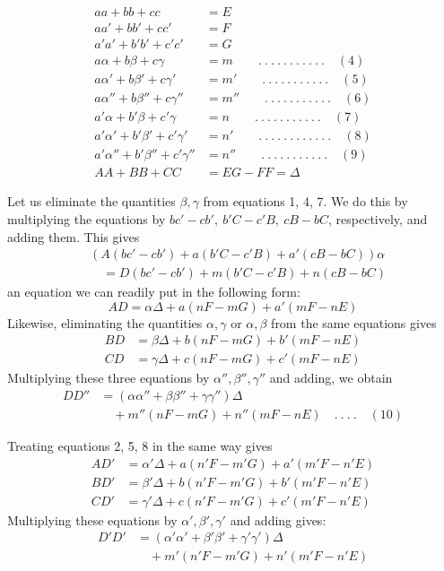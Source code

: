%
\[
\begin{aligned}
aa+bb+cc&=E\\
aa'+bb'+cc'&=F\\
a'a'+b'b'+c'c'&=G\\
a\alpha+b\beta+c\gamma&=m\qquad .\ .\ .\ .\ .\ .\ .\ .\ .\ .\ .\quad(4)\\
a\alpha'+b\beta'+c\gamma'&=m'\qquad .\ .\ .\ .\ .\ .\ .\ .\ .\ .\ .\quad(5)\\
a\alpha''+b\beta''+c\gamma''&=m''\qquad .\ .\ .\ .\ .\ .\ .\ .\ .\ .\ .\quad(6)\\
a'\alpha+b'\beta+c'\gamma&=n\qquad .\ .\ .\ .\ .\ .\ .\ .\ .\ .\ .\quad(7)\\
a'\alpha'+b'\beta'+c'\gamma'&=n'\qquad .\ .\ .\ .\ .\ .\ .\ .\ .\ .\ .\ .\quad(8)\\
a'\alpha''+b'\beta''+c'\gamma''&=n''\qquad .\ .\ .\ .\ .\ .\ .\ .\ .\ .\ .\quad(9)\\
AA+BB+CC&=EG-FF=\Delta
\end{aligned}
\]
\par\indent Let us eliminate the quantities \(\beta,\gamma\) from equations 1, 4, 7. We do this by multiplying the equations by \(bc'-cb',\ b'C-c'B,\ cB-bC\), respectively, and adding them. This gives
\[
\begin{aligned}
&(A(bc'-cb')+a(b'C-c'B)+a'(cB-bC))\alpha\\
&\quad=D(bc'-cb')+m(b'C-c'B)+n(cB-bC)
\end{aligned}
\]
an equation we can readily put in the following form:
\[
AD=\alpha\Delta+a(nF-mG)+a'(mF-nE)
\]
Likewise, eliminating the quantities \(\alpha,\gamma\) or \(\alpha,\beta\) from the same equations gives
\[
\begin{aligned}
BD&=\beta\Delta+b(nF-mG)+b'(mF-nE)\\
CD&=\gamma\Delta+c(nF-mG)+c'(mF-nE)
\end{aligned}
\]
Multiplying these three equations by \(\alpha'',\beta'',\gamma''\) and adding, we obtain
\[
\begin{aligned}
DD''&=(\alpha\alpha''+\beta\beta''+\gamma\gamma'')\Delta\\
&\quad+m''(nF-mG)+n''(mF-nE)\quad .\ .\ .\ .\quad(10)
\end{aligned}
\]
\par\indent Treating equations 2, 5, 8 in the same way gives
\[
\begin{aligned}
AD'&=\alpha'\Delta+a(n'F-m'G)+a'(m'F-n'E)\\
BD'&=\beta'\Delta+b(n'F-m'G)+b'(m'F-n'E)\\
CD'&=\gamma'\Delta+c(n'F-m'G)+c'(m'F-n'E)
\end{aligned}
\]
Multiplying these equations by \(\alpha',\beta',\gamma'\) and adding gives:
\[
\begin{aligned}
D'D'&=(\alpha'\alpha'+\beta'\beta'+\gamma'\gamma')\Delta\\
&\quad+m'(n'F-m'G)+n'(m'F-n'E)
\end{aligned}
\]

